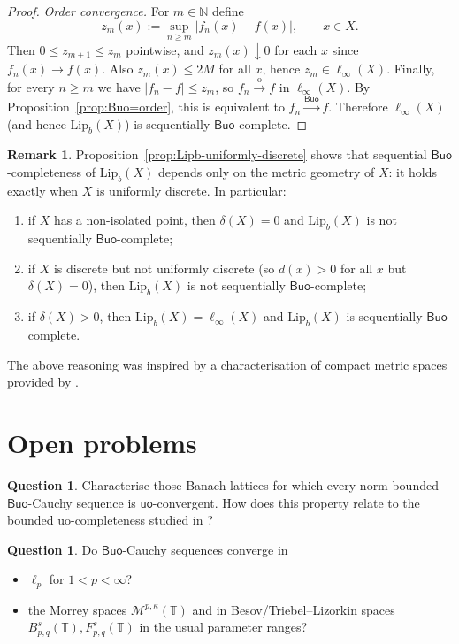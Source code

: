 \documentclass[11pt]{amsart}
\theoremstyle{definition}
\newtheorem{remark}[theorem]{Remark}
\newtheorem{question}[theorem]{Question}
\newcommand{\T}{\mathbb{T}}
\newcommand{\N}{\mathbb{N}}
\newcommand{\uo}{\ensuremath{\mathsf{uo}}}
\newcommand{\Buo}{\ensuremath{\mathsf{Buo}}}
\renewcommand{\le}{\leqslant}
\renewcommand{\ge}{\geqslant}
\begin{document}
\begin{proof}
\smallskip\noindent
\emph{Order convergence.}
For $m\in\N$ define
\[
z_m(x):=\sup_{n\ge m}|f_n(x)-f(x)|,\qquad x\in X.
\]
Then $0\le z_{m+1}\le z_m$ pointwise, and $z_m(x)\downarrow0$ for each $x$ since $f_n(x)\to f(x)$.
Also $z_m(x)\le 2M$ for all $x$, hence $z_m\in\ell_\infty(X)$.
Finally, for every $n\ge m$ we have $|f_n-f|\le z_m$, so $f_n\xrightarrow{\mathrm{o}}f$ in $\ell_\infty(X)$.
By Proposition~\ref{prop:Buo=order}, this is equivalent to $f_n\xrightarrow{\Buo}f$.
Therefore $\ell_\infty(X)$ (and hence $\mathrm{Lip}_b(X)$) is sequentially \Buo-complete.
\end{proof}

\begin{remark}\label{rem:Lipb-characterisation}
Proposition~\ref{prop:Lipb-uniformly-discrete} shows that sequential \Buo-completeness of $\mathrm{Lip}_b(X)$
depends only on the metric geometry of $X$: it holds exactly when $X$ is uniformly discrete.
In particular:
\begin{enumerate}[\upshape(i)]
\item if $X$ has a non-isolated point, then $\delta(X)=0$ and $\mathrm{Lip}_b(X)$ is not sequentially \Buo-complete;
\item if $X$ is discrete but not uniformly discrete (so $d(x)>0$ for all $x$ but $\delta(X)=0$), then $\mathrm{Lip}_b(X)$ is not sequentially \Buo-complete;
\item if $\delta(X)>0$, then $\mathrm{Lip}_b(X)=\ell_\infty(X)$ and $\mathrm{Lip}_b(X)$ is sequentially \Buo-complete.
\end{enumerate}
\end{remark}


The above reasoning was inspired by a characterisation of compact metric spaces provided by \cite{HH}.


\section{Open problems}\label{sec:open-problems}
\begin{question}\label{q:norm-bounded-buo}
Characterise those Banach lattices for which every norm bounded \Buo-Cauchy
sequence is $\uo$-convergent.  How does this property relate to the bounded
uo-completeness studied in \cite{GaoTroitskyXanthosBuoComp}?
\end{question}
\begin{question}\label{q:c0-ellp-strong}
Do \Buo-Cauchy sequences converge in
\begin{itemize}
    \item $\ell_p$ for $1<p<\infty$?
    \item the Morrey spaces $\mathcal M^{p,\kappa}(\T)$ and in Besov/Triebel--Lizorkin spaces $B^s_{p,q}(\T),F^s_{p,q}(\T)$ in the usual parameter ranges?
\end{itemize}
\end{question}
\end{document}
